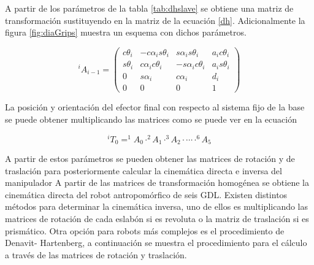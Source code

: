 A partir de los parámetros de la tabla \ref{tab:dhslave} se obtiene una matriz de transformación sustituyendo  en la matriz de la ecuación \ref{dh}. Adicionalmente la figura \ref{fig:diaGrips} muestra un esquema con dichos parámetros.

\begin{equation}
^{i}A_{i-1}=\begin{pmatrix}
c\theta_i & -c\alpha_i s\theta_i & s\alpha_i s\theta_i & a_ic\theta_i\\
s\theta_i & c\alpha_i c\theta_i & -s\alpha_i c\theta_i & a_is\theta_i\\
0 & s\alpha_i & c\alpha_i & d_i\\
0 & 0 & 0 & 1
\end{pmatrix}
\label{dh}
\end{equation}


La posición y orientación del efector final con respecto al sistema fijo de la base se puede obtener multiplicando las matrices como se puede ver en la ecuación 

\begin{equation}
^{i}T_{0}=^{1}A_{0} \cdot ^{2}A_{1} \cdot  ^{3}A_{2} \cdot \cdots \cdot ^{6}A_{5} 
\end{equation}


A partir de estos parámetros se pueden obtener las matrices de rotación y de traslación para posteriormente calcular la cinemática directa e inversa del manipulador A partir de las matrices de transformación homogénea se obtiene la cinemática directa del robot antropomórfico de seis GDL. Existen distintos métodos para determinar la cinemática inversa, uno de ellos es multiplicando las matrices de rotación de cada eslabón si es revoluta o la matriz de traslación si es prismático. Otra opción para robots más complejos es el procedimiento de Denavit- Hartenberg, a continuación se muestra el procedimiento para el cálculo a través de las matrices de rotación y traslación.





